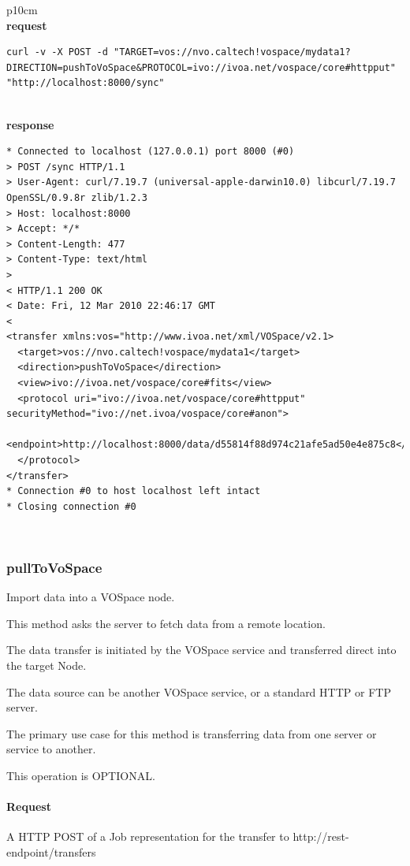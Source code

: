 \documentclass[11pt,a4paper]{ivoa}
\begin{document}
\begin{tabular}{ p{10cm} }
\\
\textbf{request} \\
\begin{lstlisting}
curl -v -X POST -d "TARGET=vos://nvo.caltech!vospace/mydata1?DIRECTION=pushToVoSpace&PROTOCOL=ivo://ivoa.net/vospace/core#httpput" "http://localhost:8000/sync"
\end{lstlisting} \\
\textbf{response} \\
\begin{lstlisting}
* Connected to localhost (127.0.0.1) port 8000 (#0)
> POST /sync HTTP/1.1
> User-Agent: curl/7.19.7 (universal-apple-darwin10.0) libcurl/7.19.7 OpenSSL/0.9.8r zlib/1.2.3
> Host: localhost:8000
> Accept: */*
> Content-Length: 477
> Content-Type: text/html
> 
< HTTP/1.1 200 OK
< Date: Fri, 12 Mar 2010 22:46:17 GMT
< 
<transfer xmlns:vos="http://www.ivoa.net/xml/VOSpace/v2.1>
  <target>vos://nvo.caltech!vospace/mydata1</target>
  <direction>pushToVoSpace</direction>
  <view>ivo://ivoa.net/vospace/core#fits</view>
  <protocol uri="ivo://ivoa.net/vospace/core#httpput" securityMethod="ivo://net.ivoa/vospace/core#anon">
    <endpoint>http://localhost:8000/data/d55814f88d974c21afe5ad50e4e875c8</endpoint>
  </protocol>
</transfer>
* Connection #0 to host localhost left intact
* Closing connection #0
\end{lstlisting} \\
\end{tabular}

\subsubsection{pullToVoSpace}
\label{subsubsec:pulltovospace}
Import data into a VOSpace node.

This method asks the server to fetch data from a remote location.

The data transfer is initiated by the VOSpace service and transferred direct into the target Node.

The data source can be another VOSpace service, or a standard HTTP or FTP server.

The primary use case for this method is transferring data from one server or service to another.

This operation is OPTIONAL.

\paragraph{Request}
A HTTP POST of a Job representation for the transfer to http://rest-endpoint/transfers
\end{document}
